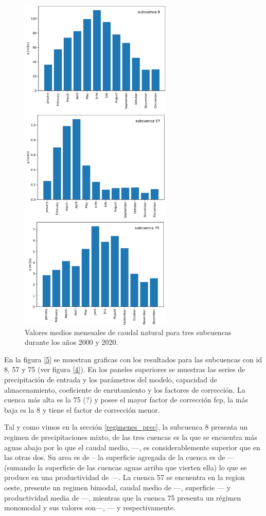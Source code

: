   \begin{figure}[h!]
    \begin{center}
      \includegraphics[height=6.5in]{Figures/outputs_MELCA_mensuales.png}
      \caption{ Valores medios mensuales de caudal natural para tres subcuencas durante los años 2000 y 2020.}
      \label{6}
    \end{center}
  \end{figure}

 En la figura \ref{5} se muestran graficas con los resultados  para 
las subcuencas con id 8, 57 y 75 (ver figura \ref{4}). 
En los paneles superiores se muestras las series de precipitación de entrada y los parámetros del modelo, 
capacidad de almacenamiento,
coeficiente de enrutamiento y los factores de corrección. 
La cuenca más alta es la 75 (?) y posee el mayor factor de corrección fcp,
la más baja es la 8 y tiene el factor de corrección menor.

Tal y como vimos en la sección \ref{regimenes_prec}, la subcuenca 8 presenta un regimen de precipitaciones 
mixto, de las tres cuencas es la que se encuentra más aguas abajo por lo que el caudal medio, ---, es 
considerablemente superior que en las otras dos. Su area es de --
la superficie agregada de la cuenca es de --- 
(sumando la superficie de las cuencas aguas arriba que vierten ella) lo que se produce en una productividad de ---.
La cuenca 57 se encuentra en la region oeste, presente un regimen bimodal, caudal medio de ---, superficie --- y 
productividad media de ---, mientras que la cuenca 75 presenta un régimen monomodal y sus valores son---, ---
y respectivamente.



